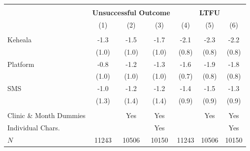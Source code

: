 \scriptsize{
\begin{tabular}{l*{6}{c}}
\hline\hline \\[-8pt]
 & \multicolumn{3}{c}{\textbf{Unsuccessful Outcome}} & \multicolumn{3}{c}{\textbf{LTFU}} \\
\rowcolor{yellow!15}            &\multicolumn{1}{c}{(1)}&\multicolumn{1}{c}{(2)}&\multicolumn{1}{c}{(3)}&\multicolumn{1}{c}{(4)}&\multicolumn{1}{c}{(5)}&\multicolumn{1}{c}{(6)}\\
\hline \\[-8pt]
Keheala & -1.3 & -1.5 & -1.7 & -2.1\sym{**} & -2.3\sym{**} & -2.2\sym{**} \\
            &   (1.0) &   (1.0) &   (1.0) &   (0.8) &   (0.8) &   (0.8)         \\
[0.4em]
Platform & -0.8 & -1.2 & -1.3 & -1.6\sym{*} & -1.9\sym{*} & -1.8\sym{*} \\
            &   (1.0) &   (1.0) &   (1.0) &   (0.7) &   (0.8) &   (0.8)         \\
[0.4em]
SMS & -1.0 & -1.2 & -1.2 & -1.4 & -1.5 & -1.3 \\
            &   (1.3) &   (1.4) &   (1.4) &   (0.9) &   (0.9) &   (0.9)         \\
[0.4em]
\hline
\hline \\[-8pt]
Clinic \& Month Dummies & & Yes & Yes & & Yes & Yes \\
Individual Chars. & & & Yes & & & Yes \\
\(N\)       &       11243         &       10506         &       10150         &       11243         &       10506         &       10150         \\
\hline\hline
\end{tabular}
}